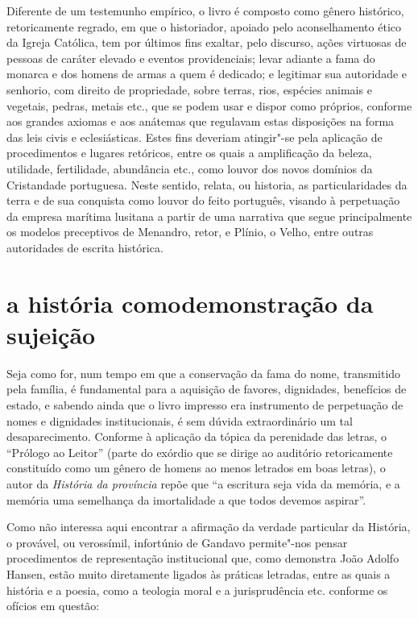 Diferente de um testemunho empírico, o livro é composto como gênero
histórico, retoricamente regrado, em que o historiador, apoiado pelo
aconselhamento ético da Igreja Católica, tem por últimos fins exaltar,
pelo discurso, ações virtuosas de pessoas de caráter elevado e eventos
providenciais; levar adiante a fama do monarca e dos homens de armas a
quem é dedicado; e legitimar sua autoridade e senhorio, com direito de
propriedade, sobre terras, rios, espécies animais e vegetais, pedras,
metais etc., que se podem usar e dispor como próprios, conforme aos
grandes axiomas e aos anátemas que regulavam estas disposições na forma
das leis civis e eclesiásticas. Estes fins deveriam atingir"-se pela
aplicação de procedimentos e lugares retóricos, entre os quais a
amplificação da beleza, utilidade, fertilidade, abundância etc., como
louvor dos novos domínios da Cristandade portuguesa. Neste sentido,
relata, ou historia, as particularidades da terra e de sua conquista
como louvor do feito português, visando à perpetuação da empresa
marítima lusitana a partir de uma narrativa que segue principalmente os
modelos preceptivos de Menandro, retor, e Plínio, o Velho, entre outras
autoridades de escrita histórica.

\section{a história como\break demonstração da sujeição}

Seja como for, num tempo em que a conservação da fama do nome,
transmitido pela família, é fundamental para a aquisição de favores,
dignidades, benefícios de estado, e sabendo ainda que o livro impresso
era instrumento de perpetuação de nomes e dignidades institucionais, é
sem dúvida extraordinário um tal desaparecimento. Conforme à aplicação
da tópica da perenidade das letras, o ``Prólogo ao
Leitor'' (parte do exórdio que se dirige ao auditório
retoricamente constituído como um gênero de homens ao menos letrados em
boas letras), o autor da \textit{História da província} repõe que
``a escritura seja vida da memória, e a memória uma
semelhança da imortalidade a que todos devemos aspirar''.

Como não interessa aqui encontrar a afirmação da verdade particular da
História, o provável, ou verossímil, infortúnio de Gandavo permite"-nos
pensar procedimentos de representação institucional que, como demonstra
João Adolfo Hansen, estão muito diretamente ligados às práticas
letradas, entre as quais a história e a poesia, como a teologia moral e
a jurisprudência etc. conforme os ofícios em questão:

